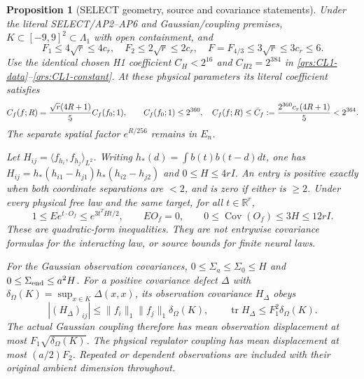 \documentclass[11pt]{article}
\theoremstyle{plain}
\newtheorem{proposition}[theorem]{Proposition}
\theoremstyle{definition}
\theoremstyle{remark}
\newcommand{\R}{\mathbb{R}}
\begin{document}
\begin{proposition}[SELECT geometry, source and covariance statements]
\label{vqal:selectgeometry}
Under the literal SELECT/AP2--AP6 and Gaussian/coupling premises,
$K\subset[-9,9]^2\subset\Lambda_1$ with open containment, and
\begin{equation}\label{vqal:normbounds}
 F_1\le4\sqrt r\le4c_r,\quad F_2\le2\sqrt r\le2c_r,
 \quad F=F_{4/3}\le3\sqrt r\le3c_r\le6.
\end{equation}
Use the identical chosen H1 coefficient $C_H<2^{16}$ and
$C_{H2}=2^{384}$ in \eqref{qrs:CL1-data}--\eqref{qrs:CL1-constant}.
At these physical parameters its literal coefficient satisfies
\begin{equation}\label{vqal:Cf}
 C_f(f;R)={\sqrt r(4R+1)\over5}C_f(f_0;1),\qquad
 C_f(f_0;1)\le2^{360},\quad
 C_f(f;R)\le\bar C_f:={2^{360}c_r(4R+1)\over5}<2^{364}.
\end{equation}
The separate spatial factor $e^{R/256}$ remains in $E_n$.

Let $H_{ij}=\langle f_{h_i},f_{h_j}\rangle_{L^2}$.
Writing $h_*(d)=\int b(t)b(t-d)dt$, one has
$H_{ij}=h_*(h_{i1}-h_{j1})h_*(h_{i2}-h_{j2})$ and
$0\le H\le4rI$. An entry is positive exactly when both coordinate
separations are $<2$, and is zero if either is $\ge2$.
Under every physical free law and the same target, for all $t\in\R^r$,
\begin{equation}\label{vqal:gramsources}
 1\le E e^{t\cdot O_f}\le e^{3t^THt/2},\qquad
 E O_f=0,\qquad 0\le\operatorname{Cov}(O_f)\le3H\le12rI.
\end{equation}
These are quadratic-form inequalities. They are not entrywise covariance
formulas for the interacting law, or source bounds for finite neural laws.

For the Gaussian observation covariances,
$0\le\Sigma_a\le\Sigma_0\le H$ and
$0\le\Sigma_{\rm end}\le a^2H$.
For a positive covariance defect $\Delta$ with
$\delta_\Omega(K)=\sup_{x\in K}\Delta(x,x)$, its observation covariance
$H_\Delta$ obeys
\begin{equation}\label{vqal:defect}
 |(H_\Delta)_{ij}|\le\|f_i\|_1\|f_j\|_1\delta_\Omega(K),\qquad
 \operatorname{tr}H_\Delta\le F_1^2\delta_\Omega(K).
\end{equation}
The actual Gaussian coupling therefore has mean observation displacement
at most $F_1\sqrt{\delta_\Omega(K)}$. The physical regulator coupling has
mean displacement at most $(a/2)F_2$. Repeated or dependent observations
are included with their original ambient dimension throughout.
\end{proposition}
\end{document}
